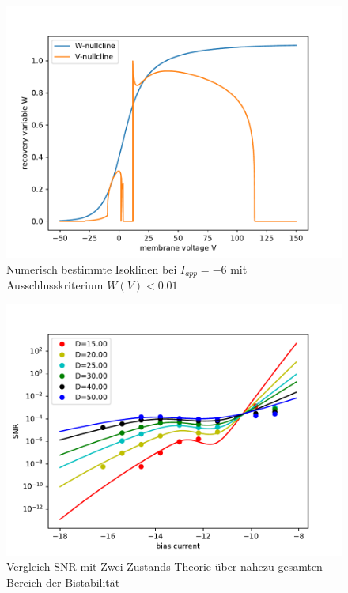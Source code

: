\documentclass[12pt,a4paper]{article}
\begin{document}
\begin{figure}[H]
	\centering
	\includegraphics[scale=1]{rinzelclinescoredge2.pdf}\caption{Numerisch bestimmte Isoklinen bei $I_{app}=-6$ mit Ausschlusskriterium $W(V)<0.01$}
	\label{rinzelclinescoredge}
\end{figure}
\begin{figure}[H]
	\centering
	\includegraphics[scale=1]{snrinzelrange26d.pdf}\caption{Vergleich SNR mit Zwei-Zustands-Theorie über nahezu gesamten Bereich der Bistabilität}
	\label{snrange}
\end{figure}
\end{document}
